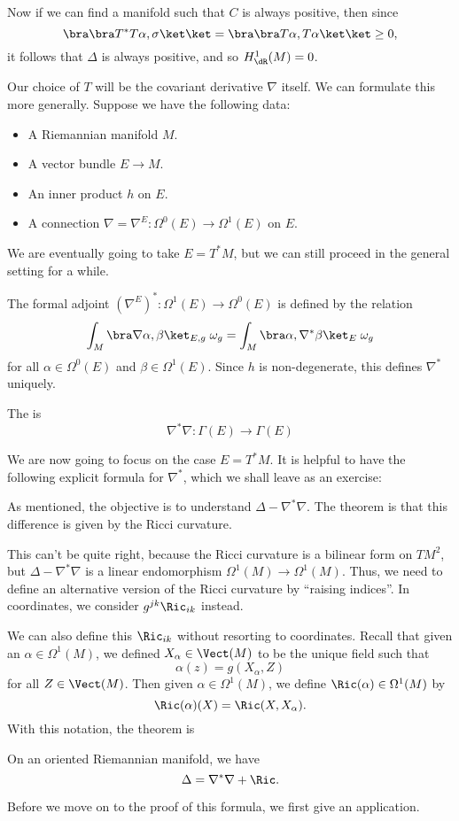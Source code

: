 \documentclass[a4paper]{article}
\begin{document}
Now if we can find a manifold such that $C$ is always positive, then since
\[
  \bra \bra T^*T \alpha, \sigma\ket\ket = \bra \bra T \alpha, T \alpha\ket\ket \geq 0,
\]
it follows that $\Delta$ is always positive, and so $H^1_{\dR}(M) = 0$.

Our choice of $T$ will be the covariant derivative $\nabla$ itself. We can formulate this more generally. Suppose we have the following data:
\begin{itemize}
  \item A Riemannian manifold $M$.
  \item A vector bundle $E \to M$.
  \item An inner product $h$ on $E$.
  \item A connection $\nabla = \nabla^E : \Omega^0(E) \to \Omega^1(E)$ on $E$.
\end{itemize}
We are eventually going to take $E = T^*M$, but we can still proceed in the general setting for a while.

The formal adjoint $(\nabla^E)^*: \Omega^1(E) \to \Omega^0(E)$ is defined by the relation
\[
  \int_M \bra \nabla \alpha, \beta\ket_{E, g}\; \omega_g = \int_M \bra \alpha, \nabla^* \beta\ket_E\; \omega_g
\]
for all $\alpha \in \Omega^0(E)$ and $\beta \in \Omega^1(E)$. Since $h$ is non-degenerate, this defines $\nabla^*$ uniquely.

\begin{defi}
  The  is
  \[
    \nabla^* \nabla : \Gamma(E) \to \Gamma(E)
  \]
\end{defi}

We are now going to focus on the case $E = T^*M$. It is helpful to have the following explicit formula for $\nabla^*$, which we shall leave as an exercise:

As mentioned, the objective is to understand $\Delta - \nabla^* \nabla$. The theorem is that this difference is given by the Ricci curvature.

This can't be quite right, because the Ricci curvature is a bilinear form on $TM^2$, but $\Delta - \nabla^* \nabla$ is a linear endomorphism $\Omega^1(M) \to \Omega^1(M)$. Thus, we need to define an alternative version of the Ricci curvature by ``raising indices''. In coordinates, we consider $g^{jk}\Ric_{ik}$ instead.

We can also define this $\Ric_{ik}$ without resorting to coordinates. Recall that given an $\alpha \in \Omega^1(M)$, we defined $X_\alpha \in \Vect(M)$ to be the unique field such that
\[
  \alpha(z) = g(X_\alpha, Z)
\]
for all $Z \in \Vect(M)$. Then given $\alpha \in \Omega^1(M)$, we define $\Ric(\alpha) \in \Omega^1(M)$ by
\[
  \Ric(\alpha)(X) = \Ric(X, X_\alpha).
\]
With this notation, the theorem is
\begin{thm}
  On an oriented Riemannian manifold, we have
  \[
    \Delta = \nabla^* \nabla + \Ric.
  \]
\end{thm}
Before we move on to the proof of this formula, we first give an application.
\end{document}
